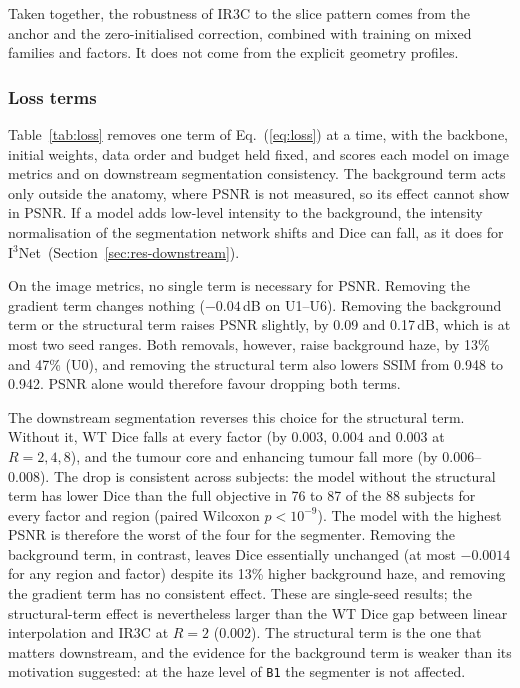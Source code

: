 \documentclass[a4paper,fleqn]{cas-dc}
\newcommand{\Ithree}{I$^3$Net\xspace}
\begin{document}
Taken together, the robustness of IR3C to the slice pattern comes from the anchor and the
zero-initialised correction, combined with training on mixed families and factors. It does
not come from the explicit geometry profiles.



\subsubsection{Loss terms}
\label{sec:pending-loss}

Table~\ref{tab:loss} removes one term of Eq.~(\ref{eq:loss}) at a time, with the backbone,
initial weights, data order and budget held fixed, and scores each model on image metrics
and on downstream segmentation consistency. The background term acts only outside the
anatomy, where PSNR is not measured, so its effect cannot show in PSNR. If a model adds
low-level intensity to the background, the intensity normalisation of the segmentation
network shifts and Dice can fall, as it does for \Ithree\
(Section~\ref{sec:res-downstream}).



On the image metrics, no single term is necessary for PSNR. Removing the gradient term
changes nothing ($-0.04$\,dB on U1--U6). Removing the background term or the structural
term raises PSNR slightly, by 0.09 and 0.17\,dB, which is at most two seed ranges. Both
removals, however, raise background haze, by 13\% and 47\% (U0), and removing the
structural term also lowers SSIM from 0.948 to 0.942. PSNR alone would therefore favour
dropping both terms.

The downstream segmentation reverses this choice for the structural term. Without it, WT
Dice falls at every factor (by 0.003, 0.004 and 0.003 at $R=2,4,8$), and the tumour core
and enhancing tumour fall more (by 0.006--0.008). The drop is consistent across subjects:
the model without the structural term has lower Dice than the full objective in 76 to 87
of the 88 subjects for every factor and region (paired Wilcoxon $p<10^{-9}$). The model
with the highest PSNR is therefore the worst of the four for the segmenter. Removing the
background term, in contrast, leaves Dice essentially unchanged (at most $-0.0014$ for any
region and factor) despite its 13\% higher background haze, and removing the gradient term
has no consistent effect. These are single-seed results; the structural-term effect is
nevertheless larger than the WT Dice gap between linear interpolation and IR3C at $R=2$
(0.002). The structural term is the one that matters downstream, and the evidence for the
background term is weaker than its motivation suggested: at the haze level of
\texttt{B1} the segmenter is not affected.
\end{document}
